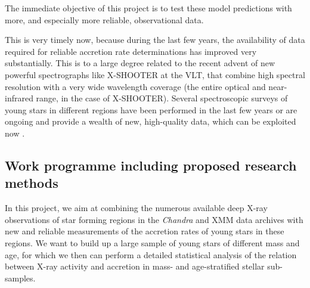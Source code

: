 \documentclass[10pt,fleqn,twoside,a4paper]{article}
\begin{document}
\begin{highlight}
The immediate objective of this project is to test these model predictions with more, and especially
more reliable, observational data.
\end{highlight}
%

This is very timely now, because during the last few years,
the availability of data required for
reliable accretion rate determinations  has improved very substantially.
This is to a large degree related to
the recent advent of new powerful spectrographs like
X-SHOOTER at the VLT, that combine high spectral resolution
with a very wide wavelength coverage (the entire optical and
near-infrared range, in the case of X-SHOOTER).
Several spectroscopic surveys of young stars in different regions
have been performed in the last few years or are ongoing and provide a wealth
of new, high-quality data, which can be exploited now
\citep[see][]{MT14}.







\subsection{Work programme including proposed research methods}





In this project, we aim at combining the numerous available deep
X-ray observations of star forming regions in the \textit{Chandra} 
and XMM data
archives with new and reliable measurements of the accretion 
rates of young stars in these regions.
We want to build up a large sample of young stars of different mass
and  age,
for which we then can perform a detailed statistical analysis
of the relation between X-ray activity and accretion in mass- 
and age-stratified stellar sub-samples. 
\end{document}
